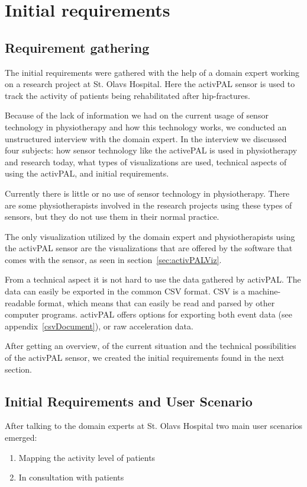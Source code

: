 \chapter{Initial requirements}

\section{Requirement gathering}
The initial requirements were gathered with the help of a domain expert working on a research project at St. Olavs Hospital. Here the activPAL sensor is used to track the activity of patients being rehabilitated after hip-fractures.

Because of the lack of information we had on the current usage of sensor technology in physiotherapy and how this technology works, we conducted an unstructured interview with the domain expert. In the interview we discussed four subjects: how sensor technology like the activePAL is used in physiotherapy and research today, what types of visualizations are used, technical aspects of using the activPAL, and initial requirements. 

Currently there is little or no use of sensor technology in physiotherapy. There are some physiotherapists involved in the research projects using these types of sensors, but they do not use them in their normal practice. 

The only visualization utilized by the domain expert  and physiotherapists using the activPAL sensor are the visualizations that are offered by the software that comes with the sensor, as seen in section~\ref{sec:activPALViz}.

From a technical aspect it is not hard to use the data gathered by activPAL. The data can easily be exported in the common CSV format. CSV is a machine-readable format, which means that can easily be read and parsed by other computer programs. activPAL offers options for exporting both event data (see appendix~\ref{csvDocument}), or raw acceleration data.

After getting an overview, of the current situation and the technical possibilities of the activPAL sensor, we created the initial requirements found in the next section.

\section{Initial Requirements and User Scenario}
After talking to the domain experts at St. Olavs Hospital two main user scenarios emerged:
\vspace{-3mm}
\begin{enumerate}[itemsep=0cm, parsep=0cm]
  \item Mapping the activity level of patients
  \item In consultation with patients
\end{enumerate}

